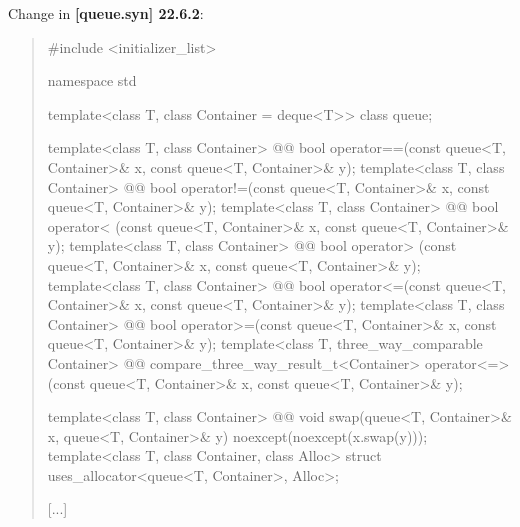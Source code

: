 \documentclass{wg21}
\begin{document}
Change in \textbf{[queue.syn] 22.6.2}:
\begin{quote}
\begin{codeblock}
#include <initializer_list>

namespace std {
  template<class T, class Container = deque<T>> class queue;
  
  template<class T, class Container>
    @@ bool operator==(const queue<T, Container>& x, const queue<T, Container>& y);
  template<class T, class Container>
    @@ bool operator!=(const queue<T, Container>& x, const queue<T, Container>& y);
  template<class T, class Container>
    @@ bool operator< (const queue<T, Container>& x, const queue<T, Container>& y);
  template<class T, class Container>
    @@ bool operator> (const queue<T, Container>& x, const queue<T, Container>& y);
  template<class T, class Container>
    @@ bool operator<=(const queue<T, Container>& x, const queue<T, Container>& y);
  template<class T, class Container>
    @@ bool operator>=(const queue<T, Container>& x, const queue<T, Container>& y);
  template<class T, three_way_comparable Container>
    @@ compare_three_way_result_t<Container>
      operator<=>(const queue<T, Container>& x, const queue<T, Container>& y);
  
  template<class T, class Container>
    @@ void swap(queue<T, Container>& x, queue<T, Container>& y)       
      noexcept(noexcept(x.swap(y)));
  template<class T, class Container, class Alloc>
    struct uses_allocator<queue<T, Container>, Alloc>;
}
\end{codeblock}
[...]
\end{quote}
\end{document}
